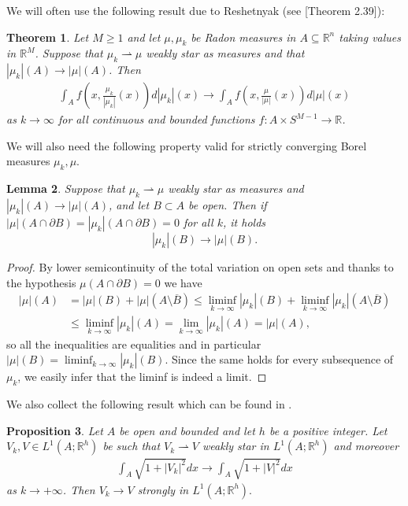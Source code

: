 \documentclass[a4paper,11pt]{article}
\numberwithin{equation}{section}
\newtheorem{theorem}{Theorem}[section]
\newtheorem{prop}[theorem]{Proposition}
\newtheorem{lemma}[theorem]{Lemma}
\newcommand{\R}{\mathbb{R}}
\begin{document}
We will often use the following result due to Reshetnyak (see \cite{AmFuPa:00}[Theorem 2.39]):
\begin{theorem}\label{teo_32}
Let $M\geq1$ and let $\mu,\mu_k$ be Radon measures in $A\subseteq \R^n$ taking values in  $\R^M$. Suppose that $\mu_k\rightharpoonup \mu$ weakly star as measures and that $|\mu_k|(A)\rightarrow |\mu|(A)$. Then 
\begin{align*}
\int_Af\left(x,\frac{\mu_k}{|\mu_k|}(x)\right)d|\mu_k|(x)\rightarrow \int_Af\left(x,\frac{\mu}{|\mu|}(x)\right)d|\mu|(x)
\end{align*}
as $k\rightarrow \infty$ for all continuous and bounded functions $f:A\times S^{M-1}\rightarrow \R$.
\end{theorem}
We will also need the following property valid for strictly converging Borel measures $\mu_k,\mu$.
\begin{lemma}
Suppose that $\mu_k\rightharpoonup \mu$ weakly star as measures and $|\mu_k|(A)\rightarrow |\mu|(A)$, and let $B\subset A$ be open. Then if $|\mu|( A\cap \partial B)=|\mu_k|( A\cap \partial B)=0$ for all $k$, it holds
$$|\mu_k|(B)\rightarrow |\mu|(B).$$
\end{lemma}
\begin{proof}
By lower semicontinuity of the total variation on open sets and thanks to the hypothesis $\mu( A\cap \partial B)=0 $ we have
\begin{align*}
	|\mu|(A)&=|\mu|(B)+|\mu|(A\setminus \overline B)\leq \liminf_{k\rightarrow \infty}|\mu_k|(B)+\liminf_{k\rightarrow \infty}|\mu_k|(A\setminus \overline B)\\
&\leq \liminf_{k\rightarrow \infty}|\mu_k|(A)=\lim_{k\rightarrow \infty}|\mu_k|(A)=|\mu|(A),
\end{align*}
so all the inequalities are equalities and in particular $|\mu|(B)=\liminf_{k\rightarrow \infty}|\mu_k|(B)$. Since the same holds for every subsequence of $\mu_k$, we easily infer that the liminf is indeed a limit.
\end{proof}

We also collect the following result which can be found in \cite[Proposition 1, Section 1.3.4]{GMS3}.

\begin{prop}\label{prop34}
	Let $A$ be open and bounded and let $h$ be a positive integer.
Let $V_k,V\in L^1(A;\R^h)$ be such that $V_k\rightharpoonup V$ weakly star in $L^1(A;\R^h)$ and moreover
\begin{align*}
\int_A\sqrt{1+|V_k|^2}dx\rightarrow \int_A\sqrt{1+|V|^2}dx
\end{align*}
as $k\rightarrow +\infty$. Then $V_k\rightarrow V$ strongly in $L^1(A;\R^h). $
\end{prop}
\end{document}
